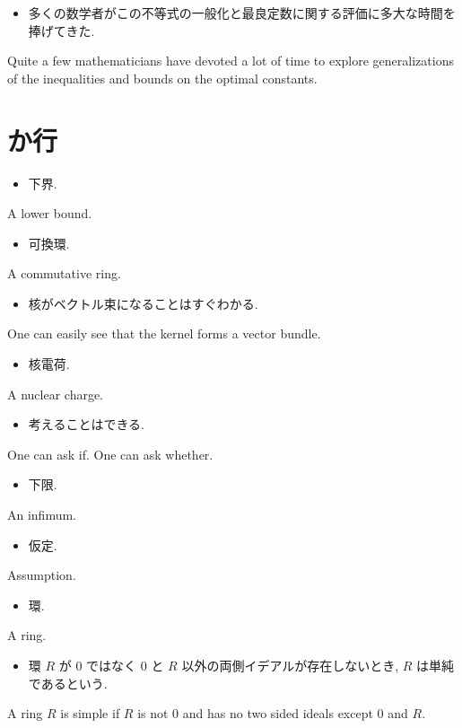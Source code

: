 \documentclass[openany, a4paper, oneside]{jsbook}
\begin{document}
\begin{itemize}
\item 多くの数学者がこの不等式の一般化と最良定数に関する評価に多大な時間を捧げてきた. \cite{LiebSeiringer1}
\end{itemize}
Quite a few mathematicians have devoted a lot of time to explore generalizations of
the inequalities and bounds on the optimal constants.
\section{か行}

\begin{itemize}
\item 下界.
\end{itemize}
A lower bound.

\begin{itemize}
\item 可換環.
\end{itemize}
A commutative ring.

\begin{itemize}
\item 核がベクトル束になることはすぐわかる.
\end{itemize}
One can easily see that the kernel forms a vector bundle.

\begin{itemize}
\item 核電荷.
\end{itemize}
A nuclear charge.

\begin{itemize}
\item 考えることはできる. \cite{LiebSeiringer1}
\end{itemize}
One can ask if. One can ask whether.

\begin{itemize}
\item 下限.
\end{itemize}
An infimum.

\begin{itemize}
\item 仮定.
\end{itemize}
Assumption.

\begin{itemize}
\item 環.
\end{itemize}
A ring.

\begin{itemize}
\item 環 $R$ が $0$ ではなく $0$ と $R$ 以外の両側イデアルが存在しないとき, $R$ は単純であるという.
\end{itemize}
A ring $R$ is simple if $R$ is not $0$ and has no two sided ideals except $0$ and $R$.
\end{document}
